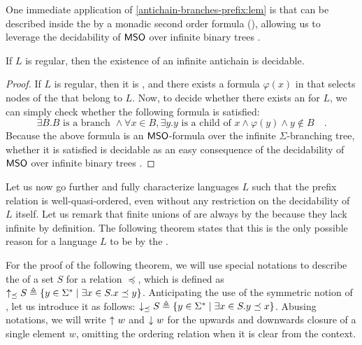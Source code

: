 One immediate application of \cref{antichain-branches-prefix:lem} is that
 can be described inside the  by a
monadic second order formula (), allowing us to leverage the
decidability of $\MSO$ over infinite binary trees \cite[Theorem 1.1]{RAB69}.

\begin{corollary}
    \label{prefix-wqo-reg-decidable:cor}
    If $L$ is regular, then the existence of an infinite antichain is decidable.
\end{corollary}
\begin{proof}
    If $L$ is regular, then it is , and there 
    exists a formula $\varphi(x)$ in \kl{$\MSO$} that selects nodes 
    of the  that belong to $L$. Now, to decide whether there
    exists an  for $L$, we can simply check whether
    the following formula is satisfied:
    \begin{equation*}
        \exists B. 
        B \text{ is a branch } \land
        \forall x \in B, \exists y. y \text{ is a child of } x \land \varphi(y) \land y \not\in B
        \quad .
    \end{equation*}
    Because the above formula is an $\MSO$-formula over the infinite
    $\Sigma$-branching tree, whether it is satisfied is decidable
    as an easy consequence of the decidability of $\MSO$ over infinite binary
    trees
    \cite[Theorem 1.1]{RAB69}.
\end{proof}

Let us now go further and fully characterize languages $L$ such that the
prefix relation is well-quasi-ordered, even without any restriction on the
decidability of $L$ itself. Let us remark that finite unions of  are
always  by the  because they lack
infinite  by definition. The following theorem states that this
is the only possible reason for a language $L$ to be  by
the .

For the proof of the following theorem, we will use special notations to
describe the  of a set $S$ for a relation $\preceq$,
which is defined as $\upset[\preceq]{S} \defined \setof{y \in \Sigma^*}{
\exists x \in S. x \preceq y}$. Anticipating the use of the symmetric notion of
, let us introduce it as follows: $\dwset[\preceq]{S} \defined \setof{y
\in \Sigma^*}{ \exists x \in S. y \preceq x}$. Abusing notations, we will
write $\upset{w}$ and $\dwset{w}$ for the upwards and downwards closure of a
single element $w$, omitting the ordering relation when it is clear from the
context.


